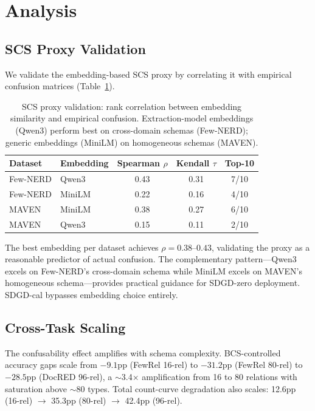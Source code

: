 \documentclass[11pt,a4paper]{article}
\begin{document}
\section{Analysis}
\label{sec:analysis}

\subsection{SCS Proxy Validation}

We validate the embedding-based SCS proxy by correlating it with empirical confusion matrices (Table~\ref{tab:scs-proxy}).

\begin{table}[t]
\centering
\small
\begin{tabular}{llccc}
\toprule
Dataset & Embedding & Spearman $\rho$ & Kendall $\tau$ & Top-10 \\
\midrule
Few-NERD & Qwen3  & 0.43 & 0.31 & 7/10 \\
Few-NERD & MiniLM & 0.22 & 0.16 & 4/10 \\
MAVEN    & MiniLM & 0.38 & 0.27 & 6/10 \\
MAVEN    & Qwen3  & 0.15 & 0.11 & 2/10 \\
\bottomrule
\end{tabular}
\caption{SCS proxy validation: rank correlation between embedding similarity and empirical confusion. Extraction-model embeddings (Qwen3) perform best on cross-domain schemas (Few-NERD); generic embeddings (MiniLM) on homogeneous schemas (MAVEN).}
\label{tab:scs-proxy}
\end{table}

The best embedding per dataset achieves $\rho = 0.38$--$0.43$, validating the proxy as a reasonable predictor of actual confusion. The complementary pattern---Qwen3 excels on Few-NERD's cross-domain schema while MiniLM excels on MAVEN's homogeneous schema---provides practical guidance for SDGD-zero deployment. SDGD-cal bypasses embedding choice entirely.

\subsection{Cross-Task Scaling}

The confusability effect amplifies with schema complexity. BCS-controlled accuracy gaps scale from $-9.1$pp (FewRel 16-rel) to $-31.2$pp (FewRel 80-rel) to $-28.5$pp (DocRED 96-rel), a $\sim$3.4$\times$ amplification from 16 to 80 relations with saturation above $\sim$80 types. Total count-curve degradation also scales: 12.6pp (16-rel) $\to$ 35.3pp (80-rel) $\to$ 42.4pp (96-rel).
\end{document}
